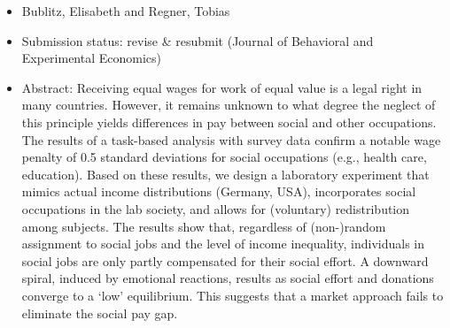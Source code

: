 \documentclass[a4paper,10pt]{article}
\begin{document}
\begin{itemize}
\begin{itemize}
\item Bublitz, Elisabeth and Regner, Tobias
\item Submission status: revise \& resubmit (Journal of Behavioral and Experimental Economics)
\item Abstract: \tiny Receiving equal wages for work of equal value is a legal right in many countries. However, it remains unknown to what degree the neglect of this principle yields differences in pay between social and other occupations. The results of a task-based analysis with survey data confirm a notable wage penalty of 0.5 standard deviations for social occupations (e.g., health care, education). Based on these results, we design a laboratory experiment that mimics actual income distributions (Germany, USA), incorporates social occupations in the lab society, and allows for (voluntary) redistribution among subjects. The results show that, regardless of (non-)random assignment to social jobs and the level of income inequality, individuals in social jobs are only partly compensated for their social effort. A downward spiral, induced by emotional reactions, results as social effort and donations converge to a `low' equilibrium. This suggests that a market approach fails to eliminate the social pay gap.


\end{itemize}



\end{itemize}



\newpage
% 

\linespread{1}


\end{document}
